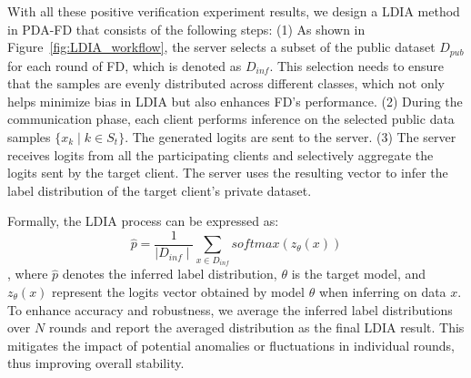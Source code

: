 With all these positive verification experiment results, we design a LDIA method in PDA-FD that consists of the following steps:
(1) As shown in Figure~\ref{fig:LDIA_workflow}, the server selects a subset of the public dataset $D_{pub}$ for each round of FD, which is denoted as $D_{inf}$.
This selection needs to ensure that the samples are evenly distributed across different classes, which not only helps minimize bias in LDIA but also enhances FD's performance. 
(2) During the communication phase, each client performs inference on the selected public data samples $\{x_k \mid k \in S_t\}$.
The generated logits are sent to the server.
(3) The server receives logits from all the participating clients and selectively aggregate the logits sent by the target client.
The server uses the resulting vector to infer the label distribution of the target client's private dataset.

Formally, the LDIA process can be expressed as:
\begin{equation}
    \hat{p} = \frac{1}{\mid D_{inf} \mid} \sum_{x \in D_{inf}} softmax(z_{\theta}(x))
\label{eq:ldia}
\end{equation}
, where $\hat{p}$ denotes the inferred label distribution, $\theta$ is the target model, and $z_{\theta}(x)$ represent the logits vector obtained by model $\theta$ when inferring on data $x$.
To enhance accuracy and robustness, we average the inferred label distributions over $N$ rounds and report the averaged distribution as the final LDIA result. This mitigates the impact of potential anomalies or fluctuations in individual rounds, thus improving overall stability.


